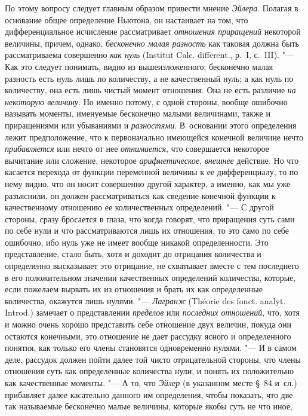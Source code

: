 По этому вопросу следует главным образом привести мнение
{\em Эйлера}. Полагая в основание общее определение
Ньютона, он настаивает на том, что дифференциальное исчисление рассматривает
{\em отношения приращений} некоторой величины, причем,
однако, {\em бесконечно малая разность} как таковая
должна быть рассматриваема совершенно {\em как нуль}
(Institut Calc. different., р.~I, с.~III).
"--- Как это следует понимать, видно из
вышеизложенного; бесконечно малая разность есть нуль лишь по количеству, а
не качественный нуль; а как нуль по количеству, она есть лишь чистый момент
отношения. Она не есть различие {\em на некоторую
величину}. Но именно потому, с одной стороны, вообще ошибочно называть
моменты, именуемые бесконечно малыми величинами, также и приращениями или
убываниями и {\em разностями}. В~основании этого
определения лежит предположение, что к первоначально имеющейся конечной
величине нечто {\em прибавляется} или нечто от нее
{\em отнимается}, что совершается некоторое вычитание
или сложение, некоторое {\em арифметическое},
{\em внешнее} действие. Но что касается перехода от
функции переменной величины к ее дифференциалу, то по нему видно, что он
носит совершенно другой характер, а именно, как мы уже разъяснили, он
должен рассматриваться как сведение конечной функции к качественному
отношению ее количественных определений. "--- С другой стороны, сразу
бросается в глаза, что когда говорят, что приращения суть сами по себе нули
и что рассматриваются лишь их отношения, то это само по себе ошибочно, ибо
нуль уже не имеет вообще никакой определенности. Это представление, стало
быть, хотя и доходит до отрицания количества и определенно высказывает это
отрицание, не схватывает вместе с тем последнего в его положительном
значении качественных определений количества, которые, если пожелаем
вырвать их из отношения и брать их как определенные количества, окажутся
лишь нулями. "--- {\em Лагранж} (Théorie des fonct. analyt. Introd.)
замечает о представлении {\em пределов} или {\em последних
отношений}, что, хотя и можно очень хорошо представить себе отношение двух
величин, покуда они остаются конечными, это отношение не дает рассудку
ясного и определенного понятия, как только его члены становятся
одновременно нулями. "--- И в самом деле, рассудок должен пойти далее той
чисто отрицательной стороны, что члены отношения суть как определенные
количества нули, и понять их положительно как качественные моменты. "--- А то,
что {\em Эйлер} (в указанном месте \S~84 и~сл.)
прибавляет далее касательно данного им определения, чтобы показать, что две
так называемые бесконечно малые величины, которые якобы суть не что иное,
